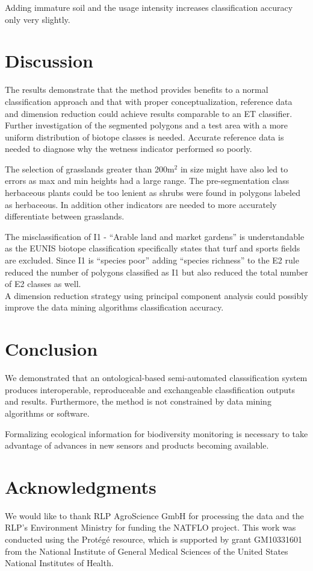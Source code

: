 \documentclass[authoryear, review,12pt,number]{elsarticle}
\begin{document}
{Adding immature soil and the usage intensity increases classification accuracy 
only very slightly.

\section{Discussion}
The results demonstrate that the method provides benefits to a normal
classification approach and that with proper conceptualization, reference data
and dimension reduction could achieve results comparable to an ET classifier.
Further investigation of the segmented polygons and a test area with a more
uniform distribution of biotope classes is needed. Accurate reference data is
needed to diagnose why the wetness indicator performed so poorly.

The selection of grasslands greater than 200m$^{2}$ in size might have also led
to errors as max and min heights had a large range. The pre-segmentation class
herbaceous plants could be too lenient as shrubs were found in polygons labeled
as herbaceous. In addition other indicators are needed to more accurately
differentiate between grasslands.

The misclassification of I1 - ``Arable land and market gardens'' is 
understandable as the EUNIS biotope classification specifically states that 
turf and sports fields are excluded. Since I1 is ``species poor'' adding 
``species richness'' to the E2 rule reduced the number of polygons classified 
as I1 but also reduced the total number of E2 classes as well.\\

A dimension reduction strategy using principal component analysis could possibly
improve the data mining algorithms classification accuracy.
\section{Conclusion}
We demonstrated that an ontological-based semi-automated classsification system
produces interoperable, reproduceable and exchangeable classfification outputs
and results. Furthermore, the method is not constrained by data mining
algorithms or software.  

Formalizing ecological information for biodiversity monitoring is
necessary to take advantage of advances in new sensors and products becoming
available. 
\section{Acknowledgments}
We would like to thank RLP AgroScience GmbH for processing the data and the 
RLP's Environment Ministry for funding the NATFLO project. This work was 
conducted using the Prot\'eg\'e resource, which is supported by grant 
GM10331601 from the National Institute of General Medical Sciences of the 
United States National Institutes of Health.
}
\end{document}
